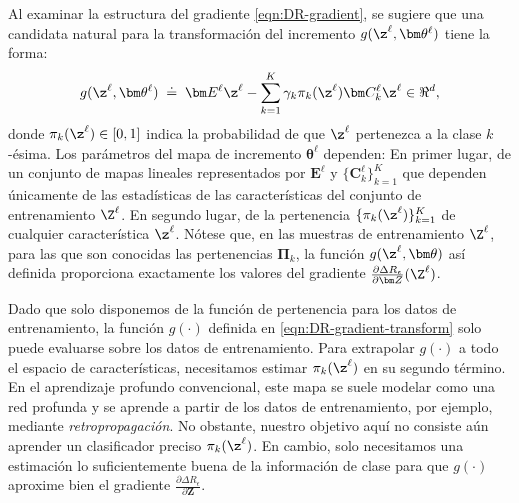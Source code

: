\documentclass[../../book-main.tex]{subfiles}
\begin{document}
Al examinar la estructura del gradiente \eqref{eqn:DR-gradient},
se sugiere que una candidata natural para la transformación del incremento
$g(\z^\ell, \bm \theta^\ell)$ tiene la forma:
\begin{equation}
    g(\z^\ell, \bm \theta^\ell) \; \doteq \; \bm E^\ell \z^\ell -
    \sum_{k=1}^K \gamma_{k} \pi_k(\z^\ell)\bm C_{k}^{\ell}  \z^{\ell}
    \in \Re^d,
    \label{eqn:DR-gradient-transform}
\end{equation}
donde $\pi_k(\z^\ell) \in [0,1]$ indica la probabilidad de que
$\z^{\ell}$ pertenezca a la clase $k$-ésima. Los parámetros del mapa de incremento
$\bm \theta^\ell$ dependen: En primer lugar, de un conjunto de mapas lineales
representados por $\bm E^{\ell}$ y $\{ \bm C^{\ell}_{k}\}_{k=1}^{K}$
que dependen únicamente de las estadísticas de las características del conjunto de entrenamiento $\Z^\ell$.
En segundo lugar, de la pertenencia $\{ \pi_k(\z^\ell)\}_{k=1}^K$ de cualquier característica $\z^\ell$.
Nótese que, en las muestras de entrenamiento $\Z^\ell$, para las que son conocidas las
pertenencias $\bm \Pi_k$, la función $g(\z^\ell, \bm
\theta)$ así definida proporciona exactamente los valores del gradiente $\frac{\partial
\Delta R_{\epsilon}}{\partial \bm Z}(\Z^\ell)$.

Dado que solo disponemos de la función de pertenencia para los datos de entrenamiento, la
función $g(\cdot)$ definida en \eqref{eqn:DR-gradient-transform} solo puede
evaluarse sobre los datos de entrenamiento. Para extrapolar $g(\cdot)$ a todo el
espacio de características, necesitamos estimar $\pi_k(\z^\ell)$ en su
segundo término. En el aprendizaje profundo convencional, este mapa se suele
modelar como una red profunda y se aprende a partir de los datos de entrenamiento, por ejemplo, mediante
{\em retropropagación}. No obstante, nuestro objetivo aquí no consiste aún aprender un
clasificador preciso $\pi_{k}(\z^\ell)$. En cambio, solo necesitamos
una estimación lo suficientemente buena de la información de clase para que
$g(\cdot)$ aproxime bien el gradiente $\frac{\partial \Delta
R_{\epsilon}}{\partial \bm Z}$.
\end{document}
